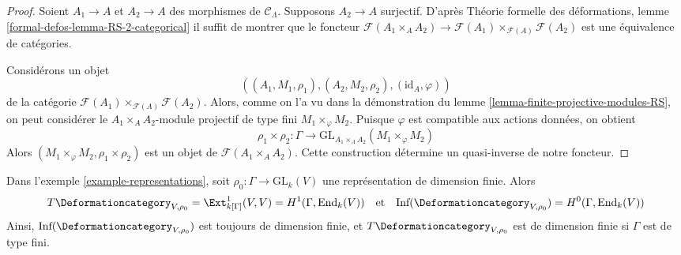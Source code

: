 \begin{proof}
Soient $A_1 \to A$ et $A_2 \to A$ des morphismes de $\mathcal{C}_\Lambda$.
Supposons $A_2 \to A$ surjectif. D'après Théorie formelle
des déformations, lemme
\ref{formal-defos-lemma-RS-2-categorical}
il suffit de montrer que le foncteur
$\mathcal{F}(A_1 \times_A A_2) \to
\mathcal{F}(A_1) \times_{\mathcal{F}(A)} \mathcal{F}(A_2)$
est une équivalence de catégories.

\medskip\noindent
Considérons un objet
$$
((A_1, M_1, \rho_1), (A_2, M_2, \rho_2), (\text{id}_A, \varphi))
$$
de la catégorie $\mathcal{F}(A_1) \times_{\mathcal{F}(A)} \mathcal{F}(A_2)$.
Alors, comme on l'a vu dans la démonstration du lemme \ref{lemma-finite-projective-modules-RS},
on peut considérer le $A_1 \times_A A_2$-module projectif
de type fini $M_1 \times_\varphi M_2$.
Puisque $\varphi$ est compatible aux actions données, on obtient
$$
\rho_1 \times \rho_2 : \Gamma \longrightarrow
\text{GL}_{A_1 \times_A A_2}(M_1 \times_\varphi M_2)
$$
Alors $(M_1 \times_\varphi M_2, \rho_1 \times \rho_2)$
est un objet de $\mathcal{F}(A_1 \times_A A_2)$.
Cette construction détermine un quasi-inverse de notre foncteur.
\end{proof}

\begin{lemma}
\label{lemma-representations-TI}
Dans l'exemple \ref{example-representations}, soit
$\rho_0 : \Gamma \to \text{GL}_k(V)$
une représentation de dimension finie. Alors
$$
T\Deformationcategory_{V, \rho_0} = \Ext^1_{k[\Gamma]}(V, V) =
H^1(\Gamma, \text{End}_k(V))
\quad\text{et}\quad
\text{Inf}(\Deformationcategory_{V, \rho_0}) = H^0(\Gamma, \text{End}_k(V))
$$
Ainsi, $\text{Inf}(\Deformationcategory_{V, \rho_0})$
est toujours de dimension finie,
et $T\Deformationcategory_{V, \rho_0}$ est de dimension finie
si $\Gamma$ est de type fini.
\end{lemma}

